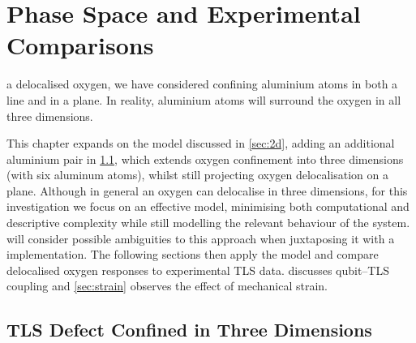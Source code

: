 \checkoddpage 
\ifoddpage\cleartoevenpage\fi
\thispagestyle{empty}
\vspace*{\fill}
    \begin{center}
    \resizebox{0.25\columnwidth}{!}{}
    \end{center}
\vspace*{\fill}
\chapter[Phase Space and Experimental Comparisons][Phase Space and Experiments]{Phase Space and Experimental Comparisons}\label{ch:tlsphase}

 a delocalised oxygen, we have considered confining aluminium atoms in both a line and in a plane.
In reality, aluminium atoms will surround the oxygen in all three dimensions.

This chapter expands on the  model discussed in \cref{sec:2d}, adding an additional aluminium pair in \cref{sec:tls}, which extends oxygen confinement into three dimensions (with six aluminum atoms), whilst still projecting oxygen delocalisation on a plane.
Although in general an oxygen can delocalise in three dimensions, for this investigation we focus on an effective  model, minimising both computational and descriptive complexity while still modelling the relevant behaviour of the system.
 will consider possible ambiguities to this approach when juxtaposing it with a  implementation.
The following sections then apply the  model and compare delocalised oxygen responses to experimental TLS data.
 discusses qubit--TLS coupling and \cref{sec:strain} observes the effect of mechanical strain.

\section{TLS Defect Confined in Three Dimensions}\label{sec:tls}

